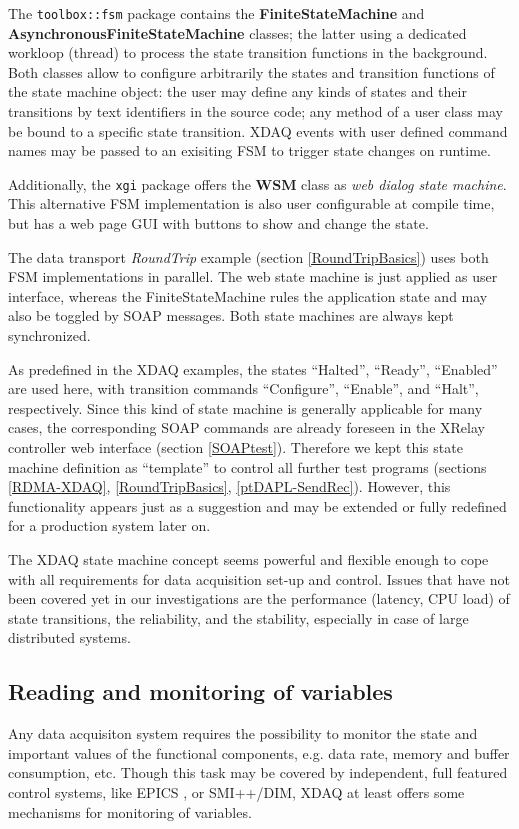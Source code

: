 The {\tt toolbox::fsm} package contains the {\bf FiniteStateMachine}
and {\bf AsynchronousFiniteStateMachine} classes; 
the latter using a dedicated workloop (thread) to process
the state transition functions in the background. Both classes allow
to configure arbitrarily the states and transition functions of the
state machine object: the user may define any kinds of states and their
transitions by text identifiers in the source code; any method of a user class 
may be bound to a specific state transition. XDAQ events with user defined
command names may be passed to an exisiting FSM to trigger 
state changes on runtime.

Additionally, the {\tt xgi} package offers the {\bf WSM} class as 
{\em web dialog state machine}. This alternative FSM implementation
is also user configurable at compile time, but has a web page GUI with
buttons to show and change the state.   
 
The data transport {\em RoundTrip} example (section \ref{RoundTripBasics}) uses
both FSM implementations in parallel. The web state machine is
just applied as user interface, whereas the FiniteStateMachine rules the
application state and may also be toggled by SOAP messages.  
Both state machines are always kept synchronized.

As predefined in the XDAQ examples, the states ``Halted'', ``Ready'', 
``Enabled'' are used here, with transition commands ``Configure'', ``Enable'',
and ``Halt'', respectively.  Since this kind of state machine is generally
applicable for many cases, the corresponding SOAP commands are already 
foreseen in the {XRelay} controller web interface (section \ref{SOAPtest}).
Therefore we kept this state machine definition as ``template'' 
to control all further test programs (sections \ref{RDMA-XDAQ}, 
\ref{RoundTripBasics}, \ref{ptDAPL-SendRec}). 
However, this functionality appears just as a suggestion and may be 
extended or fully redefined for a production system later on.

The XDAQ state machine concept seems powerful and flexible enough
to cope with all requirements for data acquisition set-up and control.
Issues that have not been covered yet in our investigations  are 
the performance (latency, CPU load) of state transitions, 
the reliability, and the stability, especially in case of large distributed 
systems. 


\subsection{Reading and monitoring of variables}
\label{XDAQ-Monitor}
Any data acquisiton system requires the possibility to monitor the state and
important values of the functional components, e.g. data rate, memory
and buffer consumption, etc. Though this task may be covered by independent,
full featured control systems, like EPICS \cite{EPICS}, or SMI++/DIM{\cite{DIM}},
XDAQ at least offers some mechanisms for monitoring of variables.


